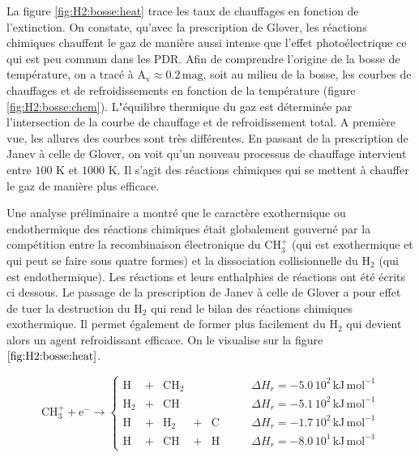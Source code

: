 La figure \ref{fig:H2:bosse:heat} trace les taux de chauffages en fonction de l'extinction. On constate, qu'avec la prescription de Glover, les réactions chimiques chauffent le gaz de manière aussi intense que l'effet photoélectrique ce qui est peu commun dans les PDR. Afin de comprendre l'origine de la bosse de température, on a tracé à $\mathrm{A}_\mathrm{v} \approx 0.2 \,\mathrm{mag}$, soit au milieu de la bosse, les courbes de chauffages et de refroidissements en fonction de la température (figure \ref{fig:H2:bosse:chem}). L"équilibre thermique du gaz est déterminée par l'intersection de la courbe de chauffage et de refroidissement total. A première vue, les allures des courbes sont très différentes. En passant de la prescription de Janev à celle de Glover, on voit qu'un nouveau processus de chauffage intervient entre $100$ K et $1000$ K. Il s'agit des réactions chimiques qui se mettent à chauffer le gaz de manière plus efficace. \newline

Une analyse préliminaire a montré que le caractère exothermique ou endothermique des réactions chimiques était globalement gouverné par la compétition entre la recombinaison électronique du $\mathrm{CH}_3^+$ (qui est exothermique et qui peut se faire sous quatre formes) et la dissociation collisionnelle du $\mathrm{H}_2$ (qui est endothermique). Les réactions et leurs enthalphies de réactions ont été écrits ci dessous. Le passage de la prescription de Janev à celle de Glover a pour effet de tuer la destruction du $\mathrm{H}_2$ qui rend le bilan des réactions chimiques exothermique. Il permet également de former plus facilement du $\mathrm{H}_2$ qui devient alors un agent refroidissant efficace. On le visualise sur la figure $\ref{fig:H2:bosse:heat}$. \newline


\begin{equation*}
     \mathrm{CH}_3^+ +  \mathrm{e}^- \rightarrow \left\{ 
    \begin{array}{lcccclr}
         \mathrm{H} &+& \mathrm{CH}_2  & & & \qquad \Delta H_r = - 5.0\,10^2 \,\mathrm{kJ}\,\mathrm{mol}^{-1}\\
         \mathrm{H}_2 &+& \mathrm{CH}  & & & \qquad \Delta H_r = - 5.1\,10^2 \,\mathrm{kJ}\,\mathrm{mol}^{-1}\\
         \mathrm{H} &+& \mathrm{H}_2 &+& \mathrm{C}  & \qquad \Delta H_r = - 1.7\,10^2 \,\mathrm{kJ}\,\mathrm{mol}^{-1}\\
         \mathrm{H} &+& \mathrm{CH} &+& \mathrm{H} & \qquad  \Delta H_r = - 8.0\,10^1 \,\mathrm{kJ}\,\mathrm{mol}^{-1}
    \end{array}\right.
\end{equation*}



